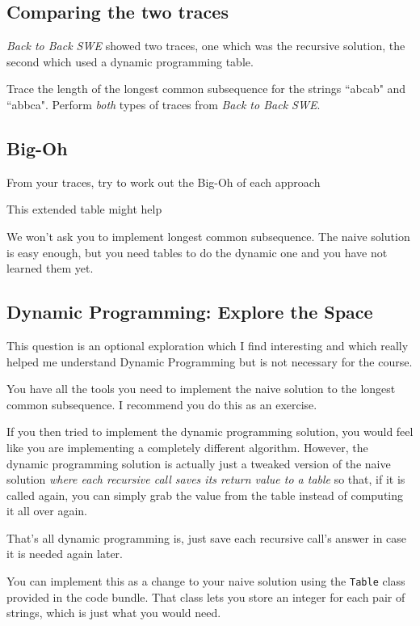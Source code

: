 \documentclass[twoside=false,DIV=14]{scrartcl}
\begin{document}
\subsection{Comparing the two traces}
\emph{Back to Back SWE} showed two traces, one which was the recursive solution, the second which used a dynamic programming table.

Trace the length of the longest common subsequence for the strings ``abcab" and ``abbca".  Perform \emph{both} types of traces from \emph{Back to Back SWE}.

\subsection{Big-Oh}
From your traces, try to work out the Big-Oh of each approach
\begin{hint}
This extended table might help



\end{hint}
We won't ask you to implement longest common subsequence.  The naive solution is easy enough, but you need tables to do the dynamic one and you have not learned them yet.

\subsection{Dynamic Programming: Explore the Space}
\begin{note}
This question is an optional exploration which I find interesting and which really helped me understand Dynamic Programming but is not necessary for the course.
\end{note}

You have all the tools you need to implement the naive solution to the longest common subsequence.  I recommend you do this as an exercise.

If you then tried to implement the dynamic programming solution, you would feel like you are implementing a completely different algorithm.  However, the dynamic programming solution is actually just a tweaked version of the naive solution \emph{where each recursive call saves its return value to a table} so that, if it is called again, you can simply grab the value from the table instead of computing it all over again.

That's all dynamic programming is, just save each recursive call's answer in case it is needed again later.

You can implement this as a change to your naive solution using the \verb|Table| class provided in the code bundle.  That class lets you store an integer for each pair of strings, which is just what you would need.
\end{document}
